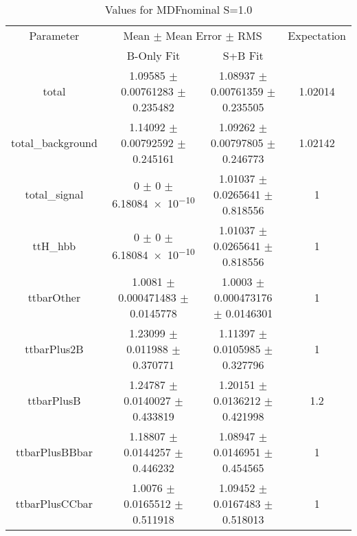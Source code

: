 \begin{table}
\centering
\caption{Values for MDFnominal S=1.0}
\begin{tabular}{cccc}
\toprule
Parameter & \multicolumn{2}{c}{Mean $\pm$ Mean Error $\pm$ RMS} & Expectation\\
 & B-Only Fit & S+B Fit & \\
\midrule
total & \num{1.09585} $\pm$ \num{0.00761283} $\pm$ \num{0.235482} & \num{1.08937} $\pm$ \num{0.00761359} $\pm$ \num{0.235505} & \num{1.02014}\\
total\_background & \num{1.14092} $\pm$ \num{0.00792592} $\pm$ \num{0.245161} & \num{1.09262} $\pm$ \num{0.00797805} $\pm$ \num{0.246773} & \num{1.02142}\\
total\_signal & \num{0} $\pm$ \num{0} $\pm$ \num{6.18084e-10} & \num{1.01037} $\pm$ \num{0.0265641} $\pm$ \num{0.818556} & \num{1}\\
ttH\_hbb & \num{0} $\pm$ \num{0} $\pm$ \num{6.18084e-10} & \num{1.01037} $\pm$ \num{0.0265641} $\pm$ \num{0.818556} & \num{1}\\
ttbarOther & \num{1.0081} $\pm$ \num{0.000471483} $\pm$ \num{0.0145778} & \num{1.0003} $\pm$ \num{0.000473176} $\pm$ \num{0.0146301} & \num{1}\\
ttbarPlus2B & \num{1.23099} $\pm$ \num{0.011988} $\pm$ \num{0.370771} & \num{1.11397} $\pm$ \num{0.0105985} $\pm$ \num{0.327796} & \num{1}\\
ttbarPlusB & \num{1.24787} $\pm$ \num{0.0140027} $\pm$ \num{0.433819} & \num{1.20151} $\pm$ \num{0.0136212} $\pm$ \num{0.421998} & \num{1.2}\\
ttbarPlusBBbar & \num{1.18807} $\pm$ \num{0.0144257} $\pm$ \num{0.446232} & \num{1.08947} $\pm$ \num{0.0146951} $\pm$ \num{0.454565} & \num{1}\\
ttbarPlusCCbar & \num{1.0076} $\pm$ \num{0.0165512} $\pm$ \num{0.511918} & \num{1.09452} $\pm$ \num{0.0167483} $\pm$ \num{0.518013} & \num{1}\\
\bottomrule
\end{tabular}
\end{table}